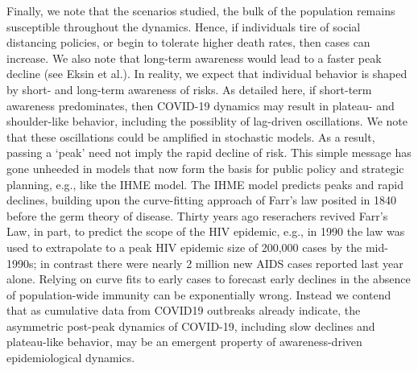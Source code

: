 
Finally, we note that the scenarios studied, the bulk of the population remains
susceptible throughout the dynamics. Hence, if individuals tire of social
distancing policies, or begin to tolerate higher death rates, then cases can
increase. We also note that long-term awareness would lead to a faster
peak decline (see Eksin et al.). In reality, we expect that individual
behavior is shaped by short- and long-term awareness of risks.  As detailed here,
if short-term awareness predominates, then COVID-19 dynamics may result
in plateau- and shoulder-like behavior, including the possiblity of 
lag-driven oscillations.  We note that these oscillations could be amplified 
in stochastic models.  As a result, passing a `peak' need not imply
the rapid decline of risk. This simple message has gone unheeded
in models that now form the basis for public policy
and strategic planning, e.g., like the IHME 
model. The IHME model predicts peaks and rapid declines, building upon 
the curve-fitting approach of Farr's law posited in 1840 before the
germ theory of disease.  Thirty years ago reserachers revived Farr's Law, in part, 
to predict the scope of the HIV epidemic, e.g., in 1990
the law was used to extrapolate to a peak HIV epidemic size of 200,000 cases by the 
mid-1990s\citep{bregman_1990};
in contrast
there were nearly 2 million new AIDS cases reported last year alone. Relying
on curve fits to early cases to forecast
early declines in the absence of population-wide immunity can be exponentially wrong.
Instead we contend that as cumulative data from COVID19 outbreaks already
indicate, the asymmetric post-peak dynamics of COVID-19, including
slow declines and plateau-like behavior, may be an emergent
property of awareness-driven epidemiological dynamics.
